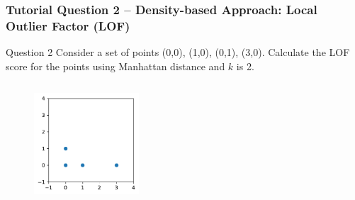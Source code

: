 \documentclass[aspectratio=169, 10pt]{beamer}
\begin{document}
\begin{frame}
    \frametitle{Tutorial Question 2 -- Density-based Approach: Local Outlier Factor (LOF)}
    \footnotesize

    \begin{block}{Question 2}
        Consider a set of points (0,0), (1,0), (0,1), (3,0). 
        Calculate the LOF score for the points using Manhattan distance and $k$ is 2.
    \end{block}
    
    \begin{columns}[t]
        \begin{column}{0.5\textwidth}

            \begin{figure}
                \centering
                \includegraphics[width=0.35\textwidth]{../imgs/outlier_lof.pdf}
            \end{figure}


\end{column}
\end{columns}
\end{frame}
\end{document}

